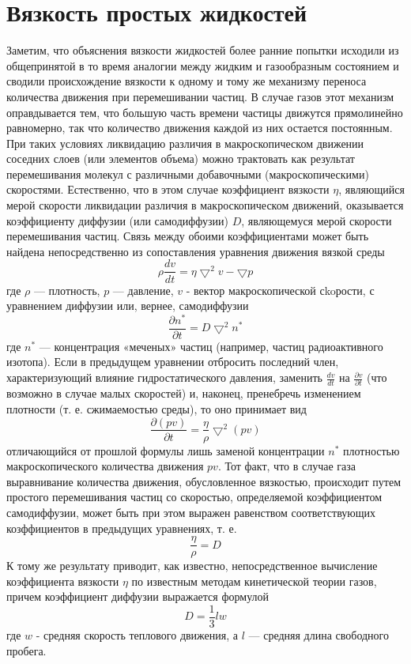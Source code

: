 \documentclass[a4paper, 12pt]{article}
\begin{document}
\section{Вязкость простых жидкостей}
 Заметим, что
 объяснения вязкости жидкостей
 более ранние попытки
 исходили из общепринятой в то время
 аналогии между жидким и газообразным состоянием и сводили происхождение вязкости к одному и 
 тому же механизму переноса количества движения при перемешивании частиц. В случае газов этот 
 механизм оправдывается тем, что большую часть времени частицы движутся прямолинейно равномерно,
так что количество движения каждой из них остается постоянным.
При таких условиях ликвидацию различия в макроскопическом движении соседних слоев (или элементов объема)
можно трактовать как результат перемешивания молекул с различными добавочными (макроскопическими) 
скоростями. Естественно, что в этом случае коэффициент вязкости $\eta$, являющийся мерой скорости ликвидации
 различия в макроскопическом
 движений, оказывается
 коэффициенту
 диффузии (или самодиффузии) $D$, являющемуся мерой скорости перемешивания частиц.
  Связь между обоими коэффициентами может быть найдена непосредственно из сопоставления уравнения 
  движения вязкой среды
 \[\rho\frac{dv}{dt} = \eta\bigtriangledown^2v - \bigtriangledown p\]
 где $\rho$ — плотность, $p$ — давление, $v$ - вектор макроскопической
 сkoрости, с уравнением диффузии или, вернее, самодиффузии
 \[\frac{\partial n^{*}}{\partial t} = D\bigtriangledown^2 n^{*}\]
 где $n^*$ — концентрация «меченых» частиц (например, частиц радиоактивного изотопа).
Если в предыдущем уравнении отбросить последний член, характеризующий влияние гидростатического давления, 
заменить $\frac{dv}{dt}$ на $\frac{\partial v}{\partial t}$ (что возможно в случае малых скоростей) и, 
наконец, пренебречь изменением плотности (т. е. сжимаемостью среды), то оно принимает вид
\[\frac{\partial (pv)}{\partial t} = \frac{\eta}{\rho} \bigtriangledown^2(pv)\]
отличающийся от прошлой формулы лишь заменой концентрации $n^*$ плотностью макроскопического количества движения $pv$. 
Тот факт, что в случае газа выравнивание количества движения, обусловленное вязкостью, происходит путем 
простого перемешивания частиц со скоростью, определяемой коэффициентом самодиффузии, может быть при этом выражен 
равенством соответствующих козффициентов в предыдущих уравнениях, т. е.
\[\frac{\eta}{\rho} = D\]
К тому же результату приводит, как известно, непосредственное вычисление коэффициента вязкости $\eta$ по известным методам 
кинетической теории газов, причем коэффициент диффузии выражается формулой
\[D = \frac{1}{3}lw\]
где $w$ - средняя скорость теплового движения, а $l$ — средняя длина свободного пробега.
\end{document}
